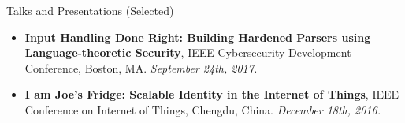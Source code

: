 \documentclass[]{mcdowellcv}
\begin{document}
    	\begin{cvsection}{Talks and Presentations (Selected)}
		\begin{cvsubsection}{}{}{}	
			\begin{itemize}
				\item \textbf{Input Handling Done Right: Building Hardened Parsers using Language-theoretic Security}, IEEE Cybersecurity Development Conference, Boston, MA. \textit{September 24th, 2017.} 
				\item \textbf{I am Joe's Fridge: Scalable Identity in the Internet of Things}, IEEE Conference on Internet of Things, Chengdu, China. \textit{December 18th, 2016.}
			\end{itemize}
		\end{cvsubsection}
	\end{cvsection}	
\end{document}

